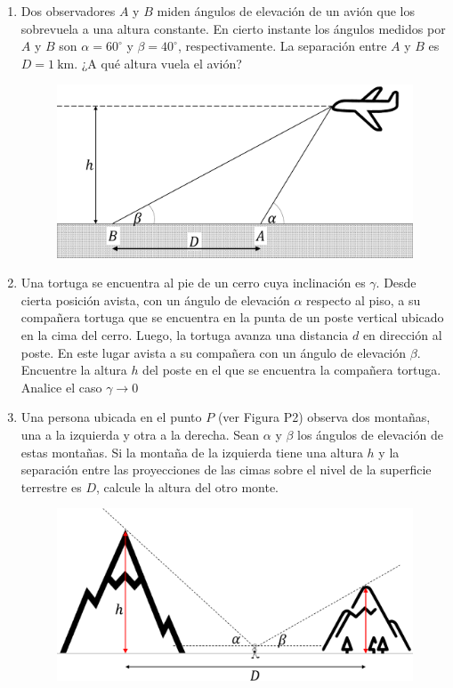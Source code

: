 \documentclass[letterpaper,11pt]{article}
\begin{document}
\begin{enumerate}\setlength{\itemsep}{0.4cm}

\item Dos observadores $A$ y $B$ miden ángulos de elevación de un avión que los sobrevuela a una altura constante. En cierto instante los ángulos medidos por $A$ y $B$ son $\alpha = 60^{\circ}$ y $\beta = 40^{\circ}$, respectivamente. La separación entre $A$ y  $B$ es $D = \SI{1}{\km}$. ¿A qué altura vuela el avión?

\begin{figure}[H]
    \centering
    \includegraphics[width=0.35\linewidth]{2021-1/Imagenes/aux0/avion.pdf}
\end{figure}


\item Una tortuga se encuentra al pie de un cerro cuya inclinación es $\gamma$. Desde cierta posición avista, con un ángulo de elevación $\alpha$ respecto al piso, a su compañera tortuga que se encuentra en la punta de un poste vertical ubicado en la cima del cerro. Luego, la tortuga avanza una distancia $d$ en dirección al poste. En este lugar avista a su compañera con un ángulo de elevación $\beta$. Encuentre la altura $h$ del poste en el que se encuentra la compañera tortuga. Analice el caso $\gamma\rightarrow 0$

\begin{figure}[H]
    \centering
        \centering
        
\end{figure}

\item Una persona ubicada en el punto $P$ (ver Figura P2) observa dos montañas, una a la izquierda y otra a la derecha. Sean $\alpha$ y $\beta$ los ángulos de elevación de estas montañas. Si la montaña de la izquierda tiene una altura $h$ y la separación entre las proyecciones de las cimas sobre el nivel de la superficie terrestre es $D$, calcule la altura del otro monte. 


\begin{figure}[H]
    \centering
    \includegraphics[width=0.4\linewidth]{2021-1/Imagenes/aux0/mountain.pdf}
\end{figure}



\end{enumerate}
\end{document}
